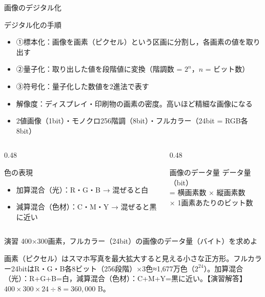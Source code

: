 \documentclass[aspectratio=43,professionalfonts,handout,10pt]{beamer}
\begin{document}
\begin{frame}[shrink=15]{画像のデジタル化}
  \begin{block}{デジタル化の手順}
    \small
    \begin{itemize}
      \item ①標本化：画像を画素（ピクセル）という区画に分割し，各画素の値を取り出す
      \item ②量子化：取り出した値を段階値に変換（階調数 = $2^n$，$n$ = ビット数）
      \item ③符号化：量子化した数値を2進法で表す
      \item 解像度：ディスプレイ・印刷物の画素の密度。高いほど精細な画像になる
      \item 2値画像（1bit）・モノクロ256階調（8bit）・フルカラー（24bit = RGB各8bit）
    \end{itemize}
  \end{block}

  \vfill

  \begin{columns}[T]
    \begin{column}{0.48\textwidth}
      \begin{exampleblock}{色の表現}
        \small
        \begin{itemize}
          \item 加算混合（光）：R・G・B → 混ぜると白
          \item 減算混合（色材）：C・M・Y → 混ぜると黒に近い
        \end{itemize}
      \end{exampleblock}
    \end{column}
    \begin{column}{0.48\textwidth}
      \begin{block}{画像のデータ量}
        \small
        データ量（bit）\\
        = 横画素数 × 縦画素数\\
        \hspace{1em}× 1画素あたりのビット数
      \end{block}
    \end{column}
  \end{columns}

  \begin{alertblock}{演習}
    400×300画素，フルカラー（24bit）の画像のデータ量（バイト）を求めよ
  \end{alertblock}

  \begin{slidenote}
    \scriptsize 画素（ピクセル）はスマホ写真を最大拡大すると見える小さな正方形。フルカラー24bitはR・G・B各8ビット（256段階）×3色≈1,677万色（$2^{24}$）。加算混合（光）：R+G+B=白，減算混合（色材）：C+M+Y=黒に近い。【演習解答】$400\times300\times24\div8=360{,}000$ B。
  \end{slidenote}
\end{frame}
\end{document}
